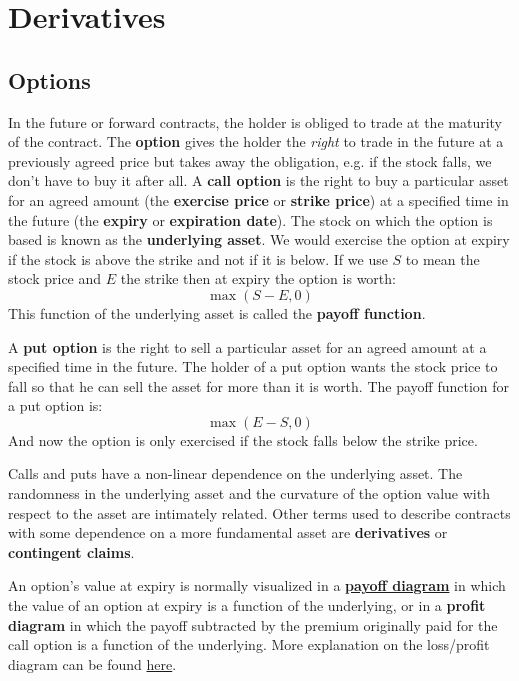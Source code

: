 \section{Derivatives}
\subsection{Options}
In the future or forward contracts, the holder is obliged to trade at the maturity of the contract. The \textbf{option} gives the holder the \textit{right} to trade in the future at a previously agreed price but takes away the obligation, e.g. if the stock falls, we don't have to buy it after all. A \textbf{call option} is the right to buy a particular asset for an agreed amount (the \textbf{exercise price} or \textbf{strike price}) at a specified time in the future (the \textbf{expiry} or \textbf{expiration date}). The stock on which the option is based is known as the \textbf{underlying asset}. We would exercise the option at expiry if the stock is above the strike and not if it is below. If we use $S$ to mean the stock price and $E$ the strike then at expiry the option is worth:
\begin{equation}
    \max(S - E, 0)
\end{equation}
This function of the underlying asset is called the \textbf{payoff function}.

A \textbf{put option} is the right to sell a particular asset for an agreed amount at a specified time in the future. The holder of a put option wants the stock price to fall so that he can sell the asset for more than it is worth. The payoff function for a put option is:
\begin{equation}
    \max(E - S, 0)
\end{equation}
And now the option is only exercised if the stock falls below the strike price.

Calls and puts have a non-linear dependence on the underlying asset. The randomness in the underlying asset and the curvature of the option value with respect to the asset are intimately related. Other terms used to describe contracts with some dependence on a more fundamental asset are \textbf{derivatives} or \textbf{contingent claims}.

An option's value at expiry is normally visualized in a \href{http://positron-investments.com/en/options-basics/payoff-diagrams/}{\textbf{payoff diagram}} in which the value of an option at expiry is a function of the underlying, or in a \textbf{profit diagram} in which the payoff subtracted by the premium originally paid for the call option is a function of the underlying. More explanation on the loss/profit diagram can be found \href{https://www.optiontradingtips.com/options101/payoff-diagrams.html}{here}.

